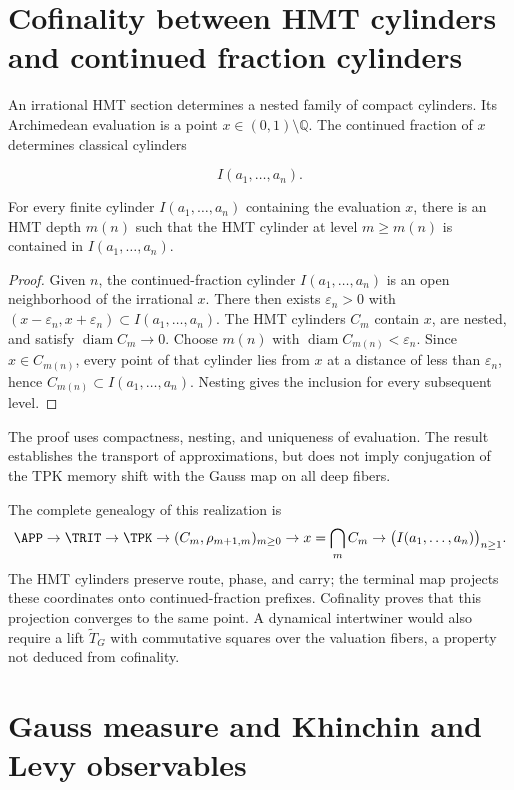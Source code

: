 \label{ch:gauss}

\section{Cofinality between HMT cylinders and continued fraction cylinders}

An irrational HMT section determines a nested family of compact cylinders. Its Archimedean evaluation is a point \(x\in(0,1)\setminus\mathbb Q\). The continued fraction of \(x\) determines classical cylinders

\[
I(a_1,\ldots,a_n).
\]

\begin{proposition}[Cofinality]
For every finite cylinder \(I(a_1,\ldots,a_n)\) containing the evaluation \(x\), there is an HMT depth \(m(n)\) such that the HMT cylinder at level \(m\ge m(n)\) is contained in \(I(a_1,\ldots,a_n)\).
\end{proposition}

\begin{proof}
Given \(n\), the continued-fraction cylinder \(I(a_1,\ldots,a_n)\) is an open neighborhood of the irrational \(x\). There then exists \(\varepsilon_n>0\) with \((x-\varepsilon_n,x+\varepsilon_n)\subset I(a_1,\ldots,a_n)\). The HMT cylinders \(C_m\) contain \(x\), are nested, and satisfy \(\operatorname{diam}C_m\to0\). Choose \(m(n)\) with \(\operatorname{diam}C_{m(n)}<\varepsilon_n\). Since \(x\in C_{m(n)}\), every point of that cylinder lies from \(x\) at a distance of less than \(\varepsilon_n\), hence \(C_{m(n)}\subset I(a_1,\ldots,a_n)\). Nesting gives the inclusion for every subsequent level.
\end{proof}

The proof uses compactness, nesting, and uniqueness of
evaluation. The result establishes the transport of approximations, but
does not imply conjugation of the TPK memory shift with the Gauss
map on all deep fibers.

The complete genealogy of this realization is
\[
\APP\to\TRIT\to\TPK
\to (C_m,\rho_{m+1,m})_{m\ge0}
\to x=\bigcap_m C_m
\to \bigl(I(a_1,\ldots,a_n)\bigr)_{n\ge1}.
\]
The HMT cylinders preserve route, phase, and carry; the terminal map projects
these coordinates onto continued-fraction prefixes. Cofinality
proves that this projection converges to the same point. A dynamical
intertwiner would also require a lift \(\widetilde T_G\) with
commutative squares over the valuation fibers, a property not
deduced from cofinality.

\section{Gauss measure and Khinchin and Levy observables}

